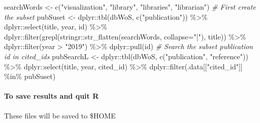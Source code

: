 \documentclass[
]{article}
\newenvironment{Shaded}{\begin{snugshade}}{\end{snugshade}}
\newcommand{\AttributeTok}[1]{\textcolor[rgb]{0.77,0.63,0.00}{#1}}
\newcommand{\CommentTok}[1]{\textcolor[rgb]{0.56,0.35,0.01}{\textit{#1}}}
\newcommand{\FunctionTok}[1]{\textcolor[rgb]{0.00,0.00,0.00}{#1}}
\newcommand{\NormalTok}[1]{#1}
\newcommand{\OtherTok}[1]{\textcolor[rgb]{0.56,0.35,0.01}{#1}}
\newcommand{\SpecialCharTok}[1]{\textcolor[rgb]{0.00,0.00,0.00}{#1}}
\newcommand{\StringTok}[1]{\textcolor[rgb]{0.31,0.60,0.02}{#1}}
\begin{document}
\begin{Shaded}
\begin{Highlighting}[]
\NormalTok{searchWords }\OtherTok{\textless{}{-}} \FunctionTok{c}\NormalTok{(}\StringTok{"visualization"}\NormalTok{, }\StringTok{"library"}\NormalTok{, }\StringTok{"libraries"}\NormalTok{, }\StringTok{"librarian"}\NormalTok{)}
\CommentTok{\# First create the subset}
\NormalTok{pubSuset }\OtherTok{\textless{}{-}}\NormalTok{ dplyr}\SpecialCharTok{::}\FunctionTok{tbl}\NormalTok{(dbWoS, }\FunctionTok{c}\NormalTok{(}\StringTok{"publication"}\NormalTok{)) }\SpecialCharTok{\%\textgreater{}\%}
\NormalTok{  dplyr}\SpecialCharTok{::}\FunctionTok{select}\NormalTok{(title, year, id) }\SpecialCharTok{\%\textgreater{}\%}
\NormalTok{  dplyr}\SpecialCharTok{::}\FunctionTok{filter}\NormalTok{(}\FunctionTok{grepl}\NormalTok{(stringr}\SpecialCharTok{::}\FunctionTok{str\_flatten}\NormalTok{(searchWords, }\AttributeTok{collapse=}\StringTok{"|"}\NormalTok{), title)) }\SpecialCharTok{\%\textgreater{}\%}
\NormalTok{  dplyr}\SpecialCharTok{::}\FunctionTok{filter}\NormalTok{(year }\SpecialCharTok{\textgreater{}} \StringTok{"2019"}\NormalTok{) }\SpecialCharTok{\%\textgreater{}\%}
\NormalTok{  dplyr}\SpecialCharTok{::}\FunctionTok{pull}\NormalTok{(id) }
\CommentTok{\# Search the subset publication id in cited\_ids}
\NormalTok{pubSearchL }\OtherTok{\textless{}{-}}\NormalTok{ dplyr}\SpecialCharTok{::}\FunctionTok{tbl}\NormalTok{(dbWoS, }\FunctionTok{c}\NormalTok{(}\StringTok{"publication"}\NormalTok{, }\StringTok{"reference"}\NormalTok{)) }\SpecialCharTok{\%\textgreater{}\%}
\NormalTok{  dplyr}\SpecialCharTok{::}\FunctionTok{select}\NormalTok{(title, year, cited\_id) }\SpecialCharTok{\%\textgreater{}\%}
\NormalTok{  dplyr}\SpecialCharTok{::}\FunctionTok{filter}\NormalTok{(.data[[}\StringTok{"cited\_id"}\NormalTok{]] }\SpecialCharTok{\%in\%}\NormalTok{ pubSuset)}
\end{Highlighting}
\end{Shaded}

\hypertarget{to-save-results-and-quit-r}{%
\paragraph{To save results and quit
R}\label{to-save-results-and-quit-r}}

These files will be saved to \$HOME
\end{document}
